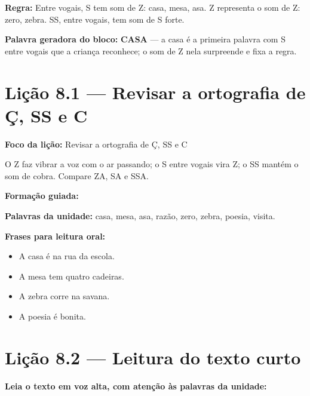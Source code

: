 \textbf{Regra:} Entre vogais, S tem som de Z: casa, mesa, asa. Z representa o som de Z: zero, zebra. SS, entre vogais, tem som de S forte.

\textbf{Palavra geradora do bloco:} \textbf{CASA} --- a casa é a primeira palavra com S entre vogais que a criança reconhece; o som de Z nela surpreende e fixa a regra.

\section{Lição 8.1 --- Revisar a ortografia de Ç, SS e C}

\textbf{Foco da lição:} Revisar a ortografia de Ç, SS e C


\begin{boquinha}
O Z faz vibrar a voz com o ar passando; o S entre vogais vira Z; o SS mantém o som de cobra. Compare ZA, SA e SSA.
\end{boquinha}

\noindent\textbf{Formação guiada:}

\begin{center}
\end{center}

\noindent\textbf{Palavras da unidade:} casa, mesa, asa, razão, zero, zebra, poesia, visita.

\noindent\textbf{Frases para leitura oral:}
\begin{itemize}[leftmargin=1.6em]
  \item A casa é na rua da escola.
  \item A mesa tem quatro cadeiras.
  \item A zebra corre na savana.
  \item A poesia é bonita.
\end{itemize}

\section{Lição 8.2 --- Leitura do texto curto}

\noindent\textbf{Leia o texto em voz alta, com atenção às palavras da unidade:}


